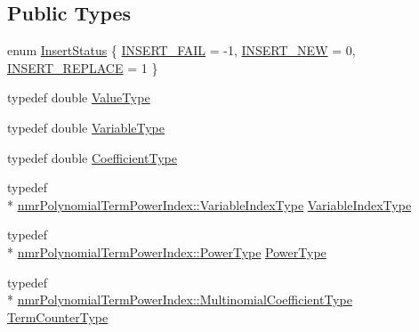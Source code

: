 \subsection*{Public Types}
\begin{DoxyCompactItemize}
\item 
enum \hyperlink{classnmr_polynomial_base_ac3b6b28653104ea70419279a35580940}{Insert\-Status} \{ \hyperlink{classnmr_polynomial_base_ac3b6b28653104ea70419279a35580940a399009f07c3207e22453068ca75a92c5}{I\-N\-S\-E\-R\-T\-\_\-\-F\-A\-I\-L} = -\/1, 
\hyperlink{classnmr_polynomial_base_ac3b6b28653104ea70419279a35580940a7116e8d3bb336fbcc733770bc625c92a}{I\-N\-S\-E\-R\-T\-\_\-\-N\-E\-W} = 0, 
\hyperlink{classnmr_polynomial_base_ac3b6b28653104ea70419279a35580940ab0f22a9f164b43cf7fd1585a0f522ed2}{I\-N\-S\-E\-R\-T\-\_\-\-R\-E\-P\-L\-A\-C\-E} = 1
 \}
\item 
typedef double \hyperlink{classnmr_polynomial_base_a72f0bc16b225e4708bcf15a77ba206e3}{Value\-Type}
\item 
typedef double \hyperlink{classnmr_polynomial_base_a666e909572cf22856c965d47f243a633}{Variable\-Type}
\item 
typedef double \hyperlink{classnmr_polynomial_base_a8693efdfc8585ccb49abea69f74f3eef}{Coefficient\-Type}
\item 
typedef \\*
\hyperlink{classnmr_polynomial_term_power_index_ac982d5f82c3a95968e92d54c92cbc3e0}{nmr\-Polynomial\-Term\-Power\-Index\-::\-Variable\-Index\-Type} \hyperlink{classnmr_polynomial_base_aae95477e451ddc7d3ee3f41cbdaadde2}{Variable\-Index\-Type}
\item 
typedef \\*
\hyperlink{classnmr_polynomial_term_power_index_a2eec01c3a2c3f56f47982ceffd8e36ed}{nmr\-Polynomial\-Term\-Power\-Index\-::\-Power\-Type} \hyperlink{classnmr_polynomial_base_a58607c884bf2e6725a77ed4d9e14ba26}{Power\-Type}
\item 
typedef \\*
\hyperlink{classnmr_polynomial_term_power_index_a09f482da776cfb829e26ad1fb381ab94}{nmr\-Polynomial\-Term\-Power\-Index\-::\-Multinomial\-Coefficient\-Type} \hyperlink{classnmr_polynomial_base_a4b0abd66b12b6f5bfb30d0eb1607e661}{Term\-Counter\-Type}
\end{DoxyCompactItemize}
